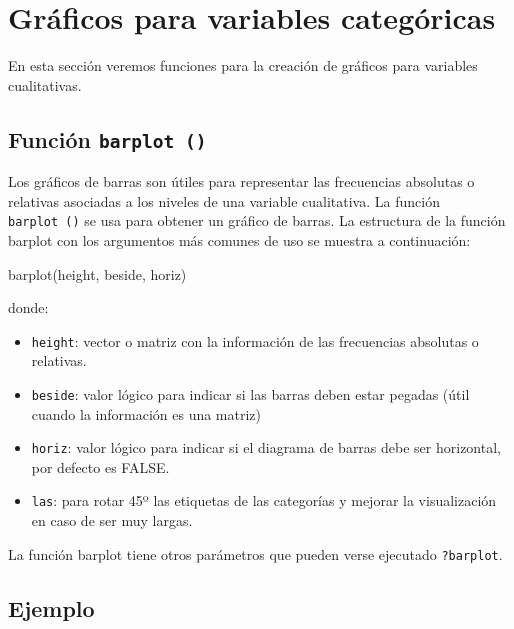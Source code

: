 \documentclass[
]{book}
\newenvironment{Shaded}{\begin{snugshade}}{\end{snugshade}}
\newcommand{\FunctionTok}[1]{\textcolor[rgb]{0.00,0.00,0.00}{#1}}
\newcommand{\NormalTok}[1]{#1}
\providecommand{\tightlist}{%
  \setlength{\itemsep}{0pt}\setlength{\parskip}{0pt}}
\begin{document}
\hypertarget{gruxe1ficos-para-variables-categuxf3ricas}{%
\section{Gráficos para variables categóricas}\label{gruxe1ficos-para-variables-categuxf3ricas}}

En esta sección veremos funciones para la creación de gráficos para variables cualitativas.

\hypertarget{funciuxf3n-barplot}{%
\subsection{\texorpdfstring{Función \texttt{barplot\ ()}}{Función barplot ()}}\label{funciuxf3n-barplot}}

Los gráficos de barras son útiles para representar las frecuencias absolutas o relativas asociadas a los niveles de una variable cualitativa. La función \texttt{barplot\ ()} se usa para obtener un gráfico de barras. La estructura de la función barplot con los argumentos más comunes de uso se muestra a continuación:

\begin{Shaded}
\begin{Highlighting}[]
\FunctionTok{barplot}\NormalTok{(height, beside, horiz)}
\end{Highlighting}
\end{Shaded}

donde:

\begin{itemize}
\tightlist
\item
  \texttt{height}: vector o matriz con la información de las frecuencias absolutas o relativas.
\item
  \texttt{beside}: valor lógico para indicar si las barras deben estar pegadas (útil cuando la información es una matriz)
\item
  \texttt{horiz}: valor lógico para indicar si el diagrama de barras debe ser horizontal, por defecto es FALSE.
\item
  \texttt{las}: para rotar 45º las etiquetas de las categorías y mejorar la visualización en caso de ser muy largas.
\end{itemize}

La función barplot tiene otros parámetros que pueden verse ejecutado \texttt{?barplot}.

\hypertarget{ejemplo-10}{%
\subsection*{Ejemplo}\label{ejemplo-10}}
\end{document}

